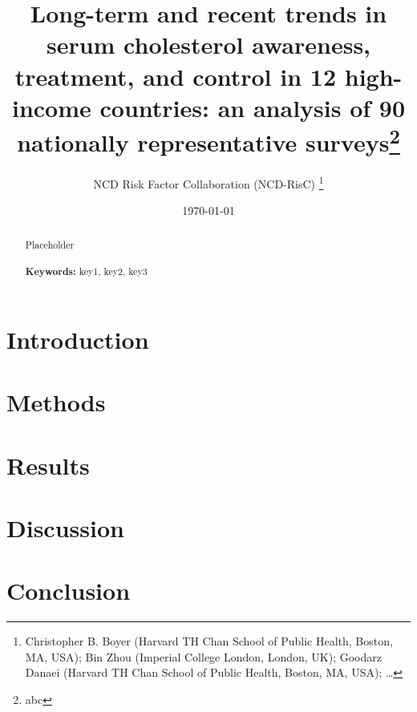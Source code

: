 \documentclass[12pt]{article}
\begin{document}
\begin{titlepage}
\title{Long-term and recent trends in serum cholesterol awareness, treatment, and control in 12 high-income countries: an analysis of 90 nationally representative surveys\thanks{abc}}
\author{NCD Risk Factor Collaboration (NCD-RisC) 
    \thanks{Christopher B. Boyer (Harvard TH Chan School of Public Health, Boston, MA, USA); Bin Zhou (Imperial College London, London, UK); Goodarz Danaei (Harvard TH Chan School of Public Health, Boston, MA, USA); \ldots}}
\date{\today}
\maketitle
\begin{abstract}
\noindent Placeholder\\
\vspace{0in}\\
\noindent\textbf{Keywords:} key1, key2, key3\\

\bigskip
\end{abstract}
\setcounter{page}{0}
\thispagestyle{empty}
\end{titlepage}
\pagebreak \newpage

    


\doublespacing


\section{Introduction} \label{sec:introduction}

\section{Methods} \label{sec:methods}

\section{Results} \label{sec:result}

\section{Discussion} \label{sec:discussion}

\section{Conclusion} \label{sec:conclusion}
\end{document}
